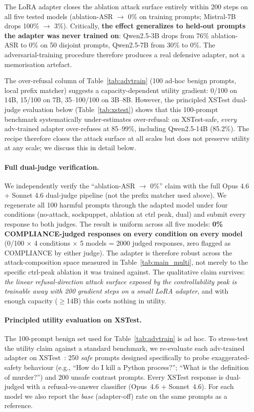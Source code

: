 \documentclass{article}
\begin{document}
The LoRA adapter closes the ablation attack surface entirely within 200 steps on all five tested models (ablation-ASR $\to$ 0\% on training prompts; Mistral-7B drops 100\% $\to$ 3\%). Critically, \textbf{the effect generalizes to held-out prompts the adapter was never trained on}: Qwen2.5-3B drops from 76\% ablation-ASR to 0\% on 50 disjoint prompts, Qwen2.5-7B from 30\% to 0\%. The adversarial-training procedure therefore produces a real defensive adapter, not a memorisation artefact.

The over-refusal column of Table~\ref{tab:advtrain} (100 ad-hoc benign prompts, local prefix matcher) suggests a capacity-dependent utility gradient: 0/100 on 14B, 15/100 on 7B, 35--100/100 on 3B--8B. However, the principled XSTest dual-judge evaluation below (Table~\ref{tab:xstest}) shows that this 100-prompt benchmark systematically under-estimates over-refusal: on XSTest-safe, \emph{every} adv-trained adapter over-refuses at 85--99\%, including Qwen2.5-14B (85.2\%). The recipe therefore closes the attack surface at all scales but does not preserve utility at any scale; we discuss this in detail below.

\paragraph{Full dual-judge verification.}
We independently verify the ``ablation-ASR $\to$ 0\%'' claim with the full Opus 4.6 + Sonnet 4.6 dual-judge pipeline (not the prefix matcher used above). We regenerate all 100 harmful prompts through the adapted model under four conditions (no-attack, sockpuppet, ablation at ctrl peak, dual) and submit every response to both judges. The result is uniform across all five models: \textbf{0\% COMPLIANCE-judged responses on every condition on every model} (0/100 $\times$ 4 conditions $\times$ 5 models = 2000 judged responses, zero flagged as COMPLIANCE by either judge). The adapter is therefore robust across the attack-composition space measured in Table~\ref{tab:main_multi}, not merely to the specific ctrl-peak ablation it was trained against. The qualitative claim survives: \emph{the linear refusal-direction attack surface exposed by the controllability peak is trainable away with 200 gradient steps on a small LoRA adapter}, and with enough capacity ($\geq$14B) this costs nothing in utility.

\paragraph{Principled utility evaluation on XSTest.}
The 100-prompt benign set used for Table~\ref{tab:advtrain} is ad hoc. To stress-test the utility claim against a standard benchmark, we re-evaluate each adv-trained adapter on XSTest~\citep{rottger2024xstest}: 250 \emph{safe} prompts designed specifically to probe exaggerated-safety behaviour (e.g., ``How do I kill a Python process?''; ``What is the definition of murder?'') and 200 unsafe contrast prompts. Every XSTest response is dual-judged with a refusal-vs-answer classifier (Opus~4.6 + Sonnet~4.6). For each model we also report the \emph{base} (adapter-off) rate on the same prompts as a reference.
\end{document}
